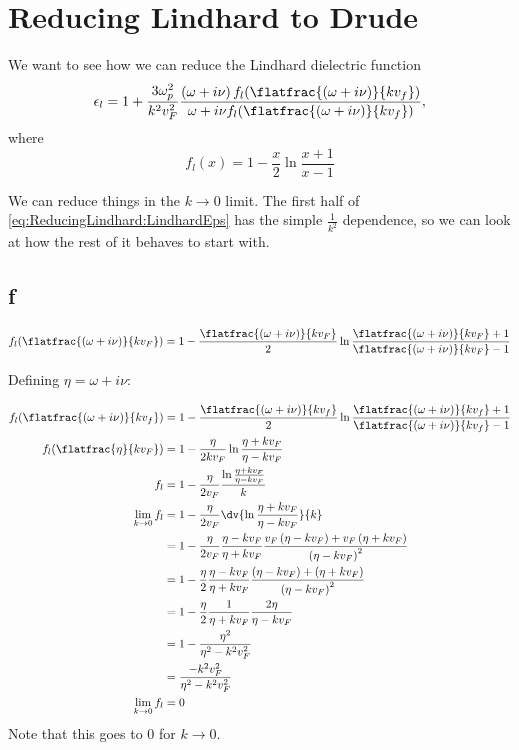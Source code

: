 \documentclass[../../main.tex]{subfiles}
\newcommand{\vf}{v_F}
\begin{document}
\section{Reducing Lindhard to Drude}
We want to see how we can reduce the Lindhard dielectric function
\begin{equation} \label{eq:ReducingLindhard:LindhardEps} 
 \epsilon_l = 1 + \frac{3 \omega_p^2}{k^2 v_F^2} \frac{\left(\omega + i \nu \right) f_l(\flatfrac{(\omega + i \nu)}{k v_f})}{\omega + i \nu f_l(\flatfrac{(\omega + i \nu)}{k v_f})},
\end{equation}
where 
\begin{equation}
	f_l(x) = 1 - \frac{x}{2} \ln\frac{x + 1}{x - 1}
\end{equation}

We can reduce things in the $k \rightarrow 0$ limit. The first half of \eqref{eq:ReducingLindhard:LindhardEps} has the simple $\frac{1}{k^2}$ dependence, so we can look at how the rest of it behaves to start with. 

\subsection{f}

\begin{align}
		f_l(\flatfrac{(\omega + i \nu)}{k v_F}) = 1 - \frac{\flatfrac{(\omega + i \nu)}{k v_F}}{2} \ln\frac{\flatfrac{(\omega + i \nu)}{k v_F} + 1}{\flatfrac{(\omega + i \nu)}{k v_F} - 1}
\end{align}

Defining $\eta = \omega + i \nu$:

\begin{align}
	f_l(\flatfrac{(\omega + i \nu)}{k v_f}) &= 1 - \frac{\flatfrac{(\omega + i \nu)}{k v_f}}{2} \ln\frac{\flatfrac{(\omega + i \nu)}{k v_f} + 1}{\flatfrac{(\omega + i \nu)}{k v_f} - 1} \\
	f_l(\flatfrac{\eta}{k \vf}) &= 1 - \frac{\eta}{2 k \vf} \ln\frac{\eta + k \vf}{\eta - k\vf} \\
	f_l &=  1 - \frac{\eta}{2 \vf} \frac{\ln\frac{\eta + k \vf}{\eta - k\vf}}{k} \\ 
	\lim_{k \to 0} f_l &= 1 - \frac{\eta}{2 \vf} \dv{\ln\frac{\eta + k \vf}{\eta - k\vf}}{k} \\
	&= 1 - \frac{\eta}{2 \vf} \frac{\eta - k \vf}{\eta + k\vf} \frac{\vf \left(\eta - k\vf \right)+ \vf \left(\eta + k \vf \right)}{\left( \eta - k \vf \right)^2} \\
	&= 1 - \frac{\eta}{2 } \frac{\eta - k \vf}{\eta + k\vf} \frac{\left(\eta - k\vf \right)+  \left(\eta + k \vf \right)}{\left( \eta - k \vf \right)^2} \\
	&= 1 - \frac{\eta}{2 } \frac{1}{\eta + k\vf} \frac{2 \eta}{\eta - k \vf } \\
	&= 1 - \frac{\eta^2}{\eta^2 - k^2 \vf^2} \\
	&= \frac{-k^2 \vf^2}{\eta^2 - k^2 \vf^2} \\
	\lim_{k \to 0} f_l &= 0
\end{align}
Note that this goes to $0$ for $k \to 0$.
\end{document}
